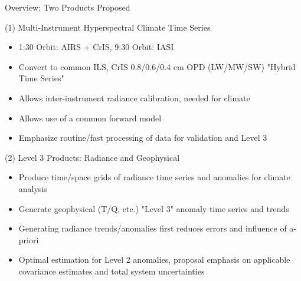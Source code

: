 \documentclass[10pt,t]{beamer}
\begin{document}
\begin{frame}[shrink=10,label={sec:orge01fc6f}]{Overview:  Two Products Proposed}
\vspace{-0.1in}
\begin{block}{(1) Multi-Instrument Hyperspectral Climate Time Series}
\begin{itemize}
\item 1:30 Orbit: AIRS + CrIS, 9:30 Orbit: IASI
\item Convert to common ILS, CrIS 0.8/0.6/0.4 cm OPD (LW/MW/SW) "Hybrid Time Series"
\item Allows inter-instrument radiance calibration, needed for climate
\item Allows use of a common forward model
\item Emphasize routine/fast processing of data for validation and Level 3
\end{itemize}
\end{block}

\begin{block}{(2) Level 3 Products: Radiance and Geophysical}
\begin{itemize}
\item Produce time/space grids of radiance time series and anomalies for climate analysis
\item Generate geophysical (T/Q, etc.) "Level 3" anomaly time series and trends
\item Generating radiance trends/anomalies first reduces errors and influence of a-priori
\item Optimal estimation for Level 2 anomalies, proposal emphasis on applicable covariance estimates and total system uncertainties
\end{itemize}
\end{block}
\end{frame}
\end{document}
